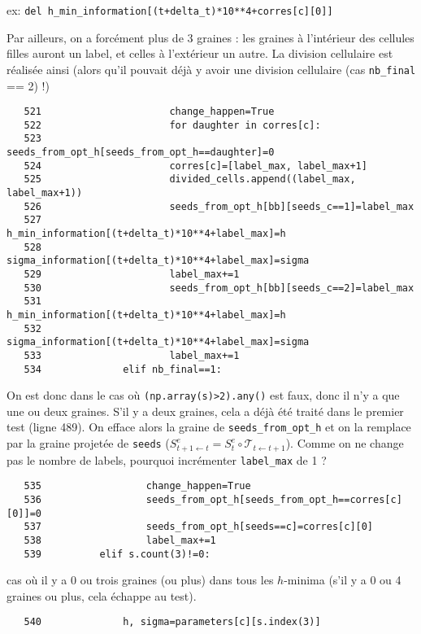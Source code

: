 \documentclass{article}
\def \mycolor {red}
\begin{document}
ex: \verb|del h_min_information[(t+delta_t)*10**4+corres[c][0]]|

Par ailleurs, on a forc\'ement plus de 3 graines : les graines \`a l'int\'erieur des cellules filles auront un label, et celles \`a l'ext\'erieur un autre. La division cellulaire est r\'ealis\'ee ainsi (alors qu'il pouvait d\'ej\`a y avoir une division cellulaire (cas \verb|nb_final| == 2) !)

\color{black}
\begin{verbatim} 
   521	                    change_happen=True
   522	                    for daughter in corres[c]:
   523	                        seeds_from_opt_h[seeds_from_opt_h==daughter]=0
   524	                    corres[c]=[label_max, label_max+1]
   525	                    divided_cells.append((label_max, label_max+1))
   526	                    seeds_from_opt_h[bb][seeds_c==1]=label_max
   527	                    h_min_information[(t+delta_t)*10**4+label_max]=h
   528	                    sigma_information[(t+delta_t)*10**4+label_max]=sigma
   529	                    label_max+=1
   530	                    seeds_from_opt_h[bb][seeds_c==2]=label_max
   531	                    h_min_information[(t+delta_t)*10**4+label_max]=h
   532	                    sigma_information[(t+delta_t)*10**4+label_max]=sigma
   533	                    label_max+=1
   534	            elif nb_final==1:
\end{verbatim} 
\color{\mycolor}
On est donc dans le cas o\`u \verb|(np.array(s)>2).any()| est faux, donc il n'y a que une ou deux graines. S'il y a deux graines, cela a d\'ej\`a \'et\'e trait\'e dans le premier test (ligne 489). On efface alors la graine de \verb|seeds_from_opt_h| et on la remplace par la graine projet\'ee de \verb|seeds| ($S^e_{t+1 \leftarrow t} = S^e_t \circ \mathcal{T}_{t \leftarrow t+1}$). Comme on ne change pas le nombre de labels, pourquoi incr\'ementer \verb|label_max| de 1 ?
\color{black}
\begin{verbatim} 
   535	                change_happen=True
   536	                seeds_from_opt_h[seeds_from_opt_h==corres[c][0]]=0
   537	                seeds_from_opt_h[seeds==c]=corres[c][0]
   538	                label_max+=1
   539	        elif s.count(3)!=0:
\end{verbatim} 
\color{\mycolor}
cas o\`u il y a 0 ou trois graines (ou plus) dans tous les $h$-minima (s'il y a 0 ou 4 graines ou plus, cela \'echappe au test).
\color{black}
\begin{verbatim} 
   540	            h, sigma=parameters[c][s.index(3)]
\end{verbatim} 
\end{document}
